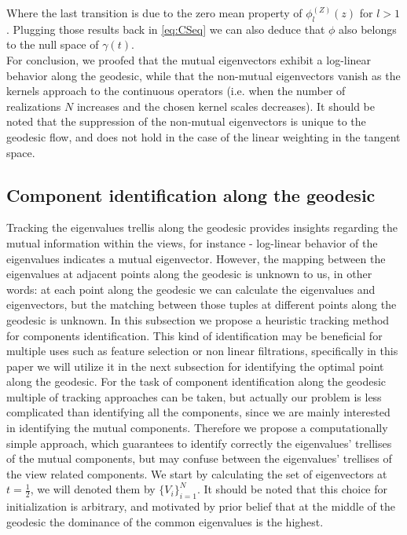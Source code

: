 \documentclass[]{article}
\theoremstyle{definition}
\begin{document}
	Where the last transition is due to the zero mean property of $\phi^{(Z)}_l(z)$ for $l>1$.
	Plugging those results back in \ref{eq:CSeq} we can also deduce that $\phi$ also belongs to the null space of $\gamma(t)$.\\

	For conclusion, we proofed that the mutual eigenvectors exhibit a log-linear behavior along the geodesic, while that the non-mutual eigenvectors vanish as the kernels approach to the continuous operators (i.e. when the number of realizations $N$ increases and the chosen kernel scales decreases). It should be noted that the suppression of the non-mutual eigenvectors is unique to the geodesic flow, and does not hold in the case of the linear weighting in the tangent space.		
	
	\subsection{Component identification along the geodesic}
	Tracking the eigenvalues trellis along the geodesic provides insights regarding the mutual information within the views, for instance - log-linear behavior of the eigenvalues indicates a mutual eigenvector. However, the mapping between the eigenvalues at adjacent points along the geodesic is unknown to us, in other words: at each point along the geodesic we can calculate the eigenvalues and eigenvectors, but the matching between those tuples at different points along the geodesic is unknown. In this subsection we propose a heuristic tracking method for components identification. This kind of identification may be beneficial for multiple uses such as feature selection or non linear filtrations, specifically in this paper we will utilize it in the next subsection for identifying the optimal point along the geodesic.
	For the task of component identification along the geodesic multiple of tracking approaches can be taken, but actually our problem is less complicated than identifying all the components, since we are mainly interested in identifying the mutual components. Therefore we propose a computationally simple approach, which guarantees to identify correctly the eigenvalues' trellises of the mutual components, but may confuse between the eigenvalues' trellises of the view related components.
	We start by calculating the set of eigenvectors at $t=\frac{1}{2}$, we will denoted them by $\{V_i\}_{i=1}^N$. It should be noted that this choice for initialization is arbitrary, and motivated by prior belief that at the middle of the geodesic the dominance of the common eigenvalues is the highest. 
\end{document}
